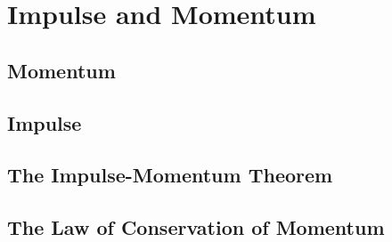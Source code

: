 \chapter{Impulse and Momentum}
	\section{Momentum}
	\section{Impulse}
	\section{The Impulse-Momentum Theorem}
	\section{The Law of Conservation of Momentum}
	

		


	


